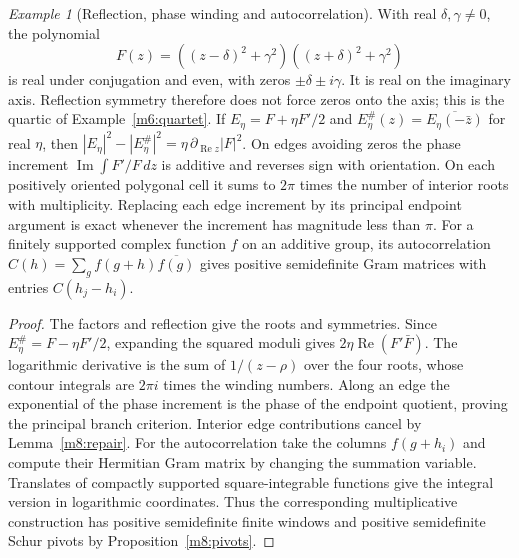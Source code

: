 \documentclass[11pt,reqno]{amsart}
\theoremstyle{definition}
\theoremstyle{remark}
\newtheorem{example}[theorem]{Example}
\numberwithin{equation}{section}
\begin{document}
\begin{example}[Reflection, phase winding and autocorrelation]\label{m8:toy}
With real $\delta,\gamma\ne0$, the polynomial
\[
 F(z)=((z-\delta)^2+\gamma^2)((z+\delta)^2+\gamma^2)
\]
is real under conjugation and even, with zeros
$\pm\delta\pm i\gamma$. It is real on the imaginary axis.  Reflection symmetry therefore does not force zeros onto the axis; this is
the quartic of Example~\ref{m6:quartet}.
If $E_\eta=F+\eta F'/2$ and $E_\eta^\#(z)=
\overline{E_\eta(-\bar z)}$ for real $\eta$, then
$|E_\eta|^2-|E_\eta^\#|^2=\eta\,\partial_{\operatorname{Re}z}|F|^2$.
On edges avoiding zeros the phase increment
$\operatorname{Im}\int F'/F\,dz$ is additive and reverses sign
with orientation. On each positively oriented polygonal cell
it sums to $2\pi$ times the number of interior roots with
multiplicity. Replacing each edge increment by its principal
endpoint argument is exact whenever the increment has magnitude
less than $\pi$.
For a finitely supported complex function $f$ on an additive
group, its autocorrelation $C(h)=\sum_g f(g+h)\overline{f(g)}$
gives positive semidefinite Gram matrices with entries
$C(h_j-h_i)$.
\end{example}
\begin{proof}
The factors and reflection give the roots and symmetries.
Since $E_\eta^\#=F-\eta F'/2$, expanding the squared moduli
gives $2\eta\operatorname{Re}(F'\bar F)$. The logarithmic
derivative is the sum of $1/(z-\rho)$ over the four roots, whose
contour integrals are $2\pi i$ times the winding numbers.
Along an edge the exponential of the phase increment is the
phase of the endpoint quotient, proving the principal branch
criterion. Interior edge contributions cancel by
Lemma~\ref{m8:repair}. For the autocorrelation take the columns
$f(g+h_i)$ and compute their Hermitian Gram matrix by changing
the summation variable. Translates of compactly supported
square-integrable functions give the integral version in
logarithmic coordinates. Thus the corresponding
multiplicative construction has positive semidefinite finite
windows and positive semidefinite Schur pivots by
Proposition~\ref{m8:pivots}.
\end{proof}
\end{document}
